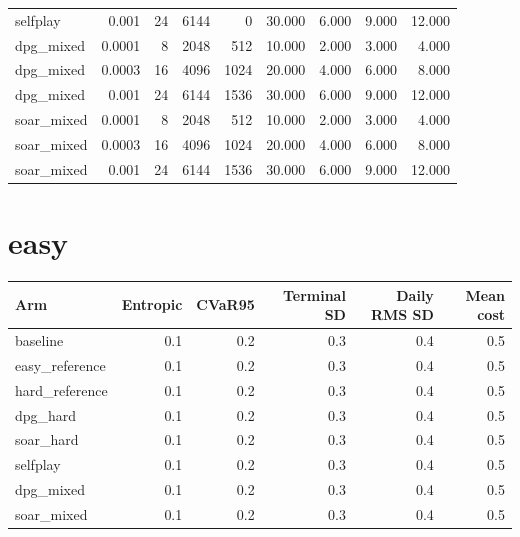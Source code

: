 \documentclass[10pt]{article}
\begin{document}
\begin{longtable}{lrrrrrrrr}
selfplay & 0.001 & 24 & 6144 & 0 & 30.000 & 6.000 & 9.000 & 12.000 \\
dpg\_mixed & 0.0001 & 8 & 2048 & 512 & 10.000 & 2.000 & 3.000 & 4.000 \\
dpg\_mixed & 0.0003 & 16 & 4096 & 1024 & 20.000 & 4.000 & 6.000 & 8.000 \\
dpg\_mixed & 0.001 & 24 & 6144 & 1536 & 30.000 & 6.000 & 9.000 & 12.000 \\
soar\_mixed & 0.0001 & 8 & 2048 & 512 & 10.000 & 2.000 & 3.000 & 4.000 \\
soar\_mixed & 0.0003 & 16 & 4096 & 1024 & 20.000 & 4.000 & 6.000 & 8.000 \\
soar\_mixed & 0.001 & 24 & 6144 & 1536 & 30.000 & 6.000 & 9.000 & 12.000 \\
\bottomrule
\end{longtable}
\endgroup
\section*{easy}
\begin{longtable}{lrrrrr}
\toprule Arm & Entropic & CVaR95 & Terminal SD & Daily RMS SD & Mean cost \\
\midrule
baseline & 0.1 & 0.2 & 0.3 & 0.4 & 0.5 \\
easy\_reference & 0.1 & 0.2 & 0.3 & 0.4 & 0.5 \\
hard\_reference & 0.1 & 0.2 & 0.3 & 0.4 & 0.5 \\
dpg\_hard & 0.1 & 0.2 & 0.3 & 0.4 & 0.5 \\
soar\_hard & 0.1 & 0.2 & 0.3 & 0.4 & 0.5 \\
selfplay & 0.1 & 0.2 & 0.3 & 0.4 & 0.5 \\
dpg\_mixed & 0.1 & 0.2 & 0.3 & 0.4 & 0.5 \\
soar\_mixed & 0.1 & 0.2 & 0.3 & 0.4 & 0.5 \\
\bottomrule
\end{longtable}
\end{document}
